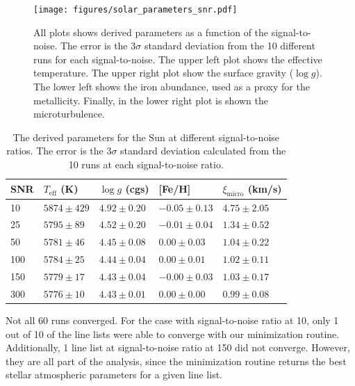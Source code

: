 \documentclass{aa}
\begin{document}
\begin{figure}[tbp!]
    \centering
    \texttt{[image: figures/solar\_parameters\_snr.pdf]}
    \caption{All plots shows derived parameters as a function of the
    signal-to-noise. The error is the 3$\sigma$ standard deviation from
    the 10 different runs for each signal-to-noise. The upper left plot
    shows the effective temperature. The upper right plot show the surface
    gravity ($\log g$). The lower left shows the iron abundance, used as a
    proxy for the metallicity. Finally, in the lower right plot is shown
    the microturbulence.}
    \label{fig:snr_sun}
\end{figure}

\begin{table}[htb!]
    \caption{The derived parameters for the Sun at different signal-to-noise
    ratios. The error is the 3$\sigma$ standard deviation calculated from
    the 10 runs at each signal-to-noise ratio.}
    \label{tab:hd20010}
    \centering
    \begin{tabular}{lllll}
      \hline\hline
        SNR & $T_\mathrm{eff}$ (K) & $\log g$ (cgs)  &       [Fe/H]     & $\xi_\mathrm{micro}$ (km/s)  \\
      \hline
        10  &    $5874 \pm 429$    & $4.92 \pm 0.20$ & $-0.05 \pm 0.13$ &     $4.75 \pm 2.05$          \\
        25  &    $5795 \pm 89$     & $4.52 \pm 0.20$ & $-0.01 \pm 0.04$ &     $1.34 \pm 0.52$          \\
        50  &    $5781 \pm 46$     & $4.45 \pm 0.08$ & $ 0.00 \pm 0.03$ &     $1.04 \pm 0.22$          \\
       100  &    $5784 \pm 25$     & $4.44 \pm 0.04$ & $ 0.00 \pm 0.01$ &     $1.02 \pm 0.11$          \\
       150  &    $5779 \pm 17$     & $4.43 \pm 0.04$ & $-0.00 \pm 0.03$ &     $1.03 \pm 0.17$          \\
       300  &    $5776 \pm 10$     & $4.43 \pm 0.01$ & $ 0.00 \pm 0.00$ &     $0.99 \pm 0.08$          \\
      \hline
    \end{tabular}
\end{table}

Not all 60 runs converged. For the case with signal-to-noise ratio at
10, only 1 out of 10 of the line lists were able to converge with our
minimization routine. Additionally, 1 line list at signal-to-noise ratio
at 150 did not converge. However, they are all part of the analysis,
since the minimization routine returns the best stellar atmospheric
parameters for a given line list.
\end{document}

